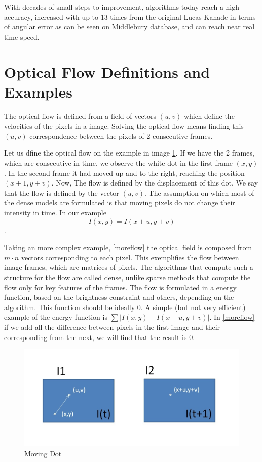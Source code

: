 \documentclass[12pt,a4paper,twoside]{report}
\begin{document}
 With decades of small steps to improvement, algorithms today reach a high accuracy, increased with up to 13 times from the original Lucas-Kanade in terms of angular error as can be seen on Middlebury database, and can reach near real time speed.
 



\section{Optical Flow Definitions and Examples}

The optical flow is defined from a field of vectors $(u,v)$ which define the velocities of the pixels in a image.
Solving the optical flow means finding this $(u,v)$ correspondence between the pixels of 2 consecutive frames.

Let us dfine the optical flow on the example in image \ref{movingDot}. If we have the 2 frames, which are consecutive in time, we observe the white dot in the first frame $(x,y)$. In the second frame it had moved up and to the right, reaching the position $(x+1, y+v)$. Now, The flow is defined by the displacement of this dot. We say that the flow is defined by the vector $(u,v)$. The assumption on which most of the dense models are formulated is that moving pixels do not change their intensity in time. In our example $$I(x,y) = I(x+u, y+v)$$.

Taking an more complex example, \ref{moreflow} the optical field is composed from $m\cdot n$ vectors corresponding to each pixel. This exemplifies the flow between image frames, which are matrices of pixels. The algorithms that compute such a structure for the flow are called dense, unlike sparse methods that compute the flow only for key features of the frames. The flow is formulated in a energy function, based on the brightness  constraint and others, depending on the algorithm. This function should be ideally $0$. A simple (but not very efficient) example of the energy function is $\sum |I(x,y) - I(x+u, y+v)|$. In \ref{moreflow} if we add all the difference between pixels in the first image and their corresponding from the next, we will find that the result is 0.
\begin{figure} \label{movingDot}
\centering
\includegraphics[width = 5in]{img/movingDot} 
	\caption{Moving Dot}
\end{figure}
\end{document}
